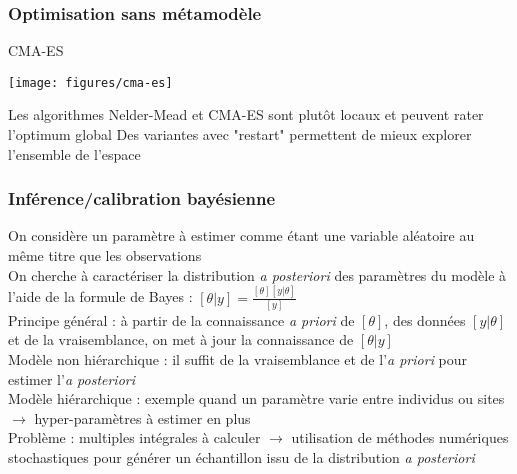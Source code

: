\documentclass[10pt]{beamer}
\begin{document}
\begin{frame}
\frametitle{Optimisation sans métamodèle}

CMA-ES\\

\begin{center}
	\texttt{[image: figures/cma-es]}
\end{center}

Les algorithmes Nelder-Mead et CMA-ES sont plutôt locaux et peuvent rater l'optimum global
Des variantes avec "restart" permettent de mieux explorer l'ensemble de l'espace

\end{frame}

\begin{frame}
\frametitle{Inférence/calibration bayésienne}

On considère un paramètre à estimer comme étant une variable aléatoire au même titre que les observations\\
\medskip
On cherche à caractériser la distribution \textit{a posteriori} des paramètres du modèle à l'aide de la formule de Bayes : $ [\theta|y] = \frac{[\theta][y|\theta]}{[y]} $\\
\medskip
Principe général : à partir de la connaissance \textit{a priori} de $ [\theta] $, des données $ [y|\theta] $ et de la vraisemblance, on met à jour la connaissance de $ [\theta|y] $\\
\medskip
Modèle non hiérarchique : il suffit de la vraisemblance et de l'\textit{a priori} pour estimer l'\textit{a posteriori}\\
\medskip
Modèle hiérarchique : exemple quand un paramètre varie entre individus ou sites $\rightarrow$ hyper-paramètres à estimer en plus\\
\medskip
Problème : multiples intégrales à calculer $\rightarrow$ utilisation de méthodes numériques stochastiques pour générer un échantillon issu de la distribution \textit{a posteriori}

\end{frame}
\end{document}
